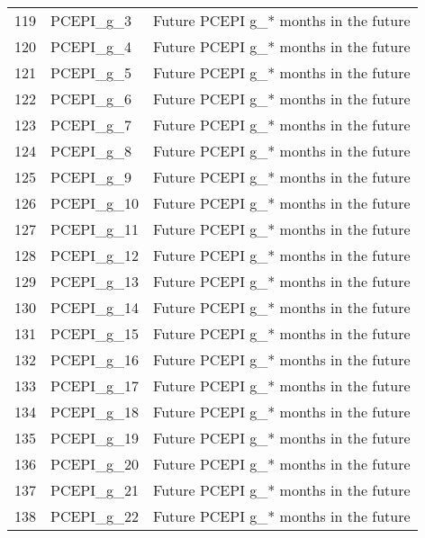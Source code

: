 \begin{tabular}{lll}
119 &                  PCEPI\_g\_3 &              Future PCEPI g\_* months in the future \\
120 &                  PCEPI\_g\_4 &              Future PCEPI g\_* months in the future \\
121 &                  PCEPI\_g\_5 &              Future PCEPI g\_* months in the future \\
122 &                  PCEPI\_g\_6 &              Future PCEPI g\_* months in the future \\
123 &                  PCEPI\_g\_7 &              Future PCEPI g\_* months in the future \\
124 &                  PCEPI\_g\_8 &              Future PCEPI g\_* months in the future \\
125 &                  PCEPI\_g\_9 &              Future PCEPI g\_* months in the future \\
126 &                 PCEPI\_g\_10 &              Future PCEPI g\_* months in the future \\
127 &                 PCEPI\_g\_11 &              Future PCEPI g\_* months in the future \\
128 &                 PCEPI\_g\_12 &              Future PCEPI g\_* months in the future \\
129 &                 PCEPI\_g\_13 &              Future PCEPI g\_* months in the future \\
130 &                 PCEPI\_g\_14 &              Future PCEPI g\_* months in the future \\
131 &                 PCEPI\_g\_15 &              Future PCEPI g\_* months in the future \\
132 &                 PCEPI\_g\_16 &              Future PCEPI g\_* months in the future \\
133 &                 PCEPI\_g\_17 &              Future PCEPI g\_* months in the future \\
134 &                 PCEPI\_g\_18 &              Future PCEPI g\_* months in the future \\
135 &                 PCEPI\_g\_19 &              Future PCEPI g\_* months in the future \\
136 &                 PCEPI\_g\_20 &              Future PCEPI g\_* months in the future \\
137 &                 PCEPI\_g\_21 &              Future PCEPI g\_* months in the future \\
138 &                 PCEPI\_g\_22 &              Future PCEPI g\_* months in the future \\

\end{tabular}
